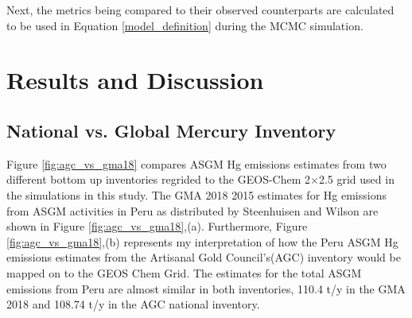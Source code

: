 \begin{flushleft}
Next, the metrics being compared to their observed counterparts are calculated to be used in Equation \ref{model_definition} during the MCMC simulation. 
\end{flushleft}



\newpage
\section{Results and Discussion}
\subsection{National vs. Global Mercury Inventory}
Figure \ref{fig:agc_vs_gma18} compares ASGM Hg emissions estimates from two different bottom up inventories regrided to the GEOS-Chem 2$\times$2.5 grid used in the simulations in this study. The GMA 2018 2015 estimates for Hg emissions from ASGM activities in Peru as distributed by Steenhuisen and Wilson\cite{steenhuisen_development_2019} are shown in Figure \ref{fig:agc_vs_gma18},(a). Furthermore, Figure \ref{fig:agc_vs_gma18},(b) represents my interpretation of how the Peru ASGM Hg emissions estimates from the Artisanal Gold Council's(AGC) inventory\cite{agc_reporte_2017} would be mapped on to the GEOS Chem Grid. The estimates for the total ASGM emissions from Peru are almost similar in both inventories, 110.4 t/y in the GMA 2018 and 108.74 t/y in the AGC national inventory.





